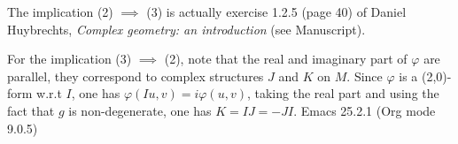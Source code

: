 \documentclass[11pt]{article}
\begin{document}
The implication (2) \(\implies\) (3) is actually exercise 1.2.5 (page 40) of Daniel Huybrechts,
\emph{Complex geometry: an introduction} (see Manuscript).

For the implication (3) \(\implies\) (2), note that the real and imaginary part of \(\varphi\) are parallel,
they correspond to complex structures \(J\) and \(K\) on \(M\). Since \(\varphi\) is a (2,0)-form w.r.t
\(I\), one has \(\varphi(Iu, v) = i\varphi(u,v)\), taking the real part and using the fact that \(g\) is
non-degenerate, one has \(K = IJ = -JI\).
Emacs 25.2.1 (Org mode 9.0.5)
\end{document}
